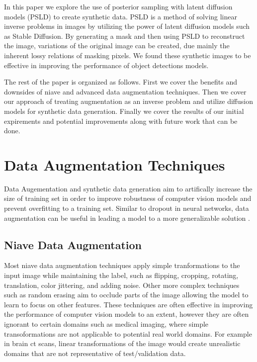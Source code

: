 \documentclass{article}
\begin{document}
In this paper we explore the use of posterior sampling with latent diffusion models (PSLD) to create synthetic data. PSLD
is a method of solving linear inverse problems in images by utilizing the power of latent diffusion models such as Stable Diffusion. By
generating a mask and then using PSLD to reconstruct the image, variations of the original image can be created,
due mainly the inherent lossy relations of masking pixels. We found these synthetic images to be effective in improving
the performance of object detections models.

The rest of the paper is organized as follows. First we cover the benefits and downsides of niave and advanced data
augmentation techniques. Then we cover our approach of treating augmentation as an inverse problem and utilize diffusion
models for synthetic data generation. Finally we cover the results of our initial expirements and potential improvements along
with future work that can be done.
 

\section{Data Augmentation Techniques}

Data Augementation and synthetic data generation aim to artifically increase the size of training set in order to improve robustness
of computer vision models and prevent overfitting to a training set. Similar to dropout in neural networks, data augmentation can be
useful in leading a model to a more generalizable solution \cite{1708.04896}.

\subsection{Niave Data Augmentation}

Most niave data augmentation techniques apply simple tranformations to the input image while maintaining the label, such as flipping,
cropping, rotating, translation, color jittering, and adding noise. Other more complex techniques such as random erasing aim to occlude
parts of the image allowing the model to learn to focus on other features. These techniques are often effective in improving the performance
of computer vision models to an extent, however they are often ignorant to certain domains such as medical imaging, where simple
transoformations are not applicable to potential real world domains. For example in brain ct scans, linear transformations of the image
would create unrealistic domains that are not representative of test/validation data.
\end{document}
